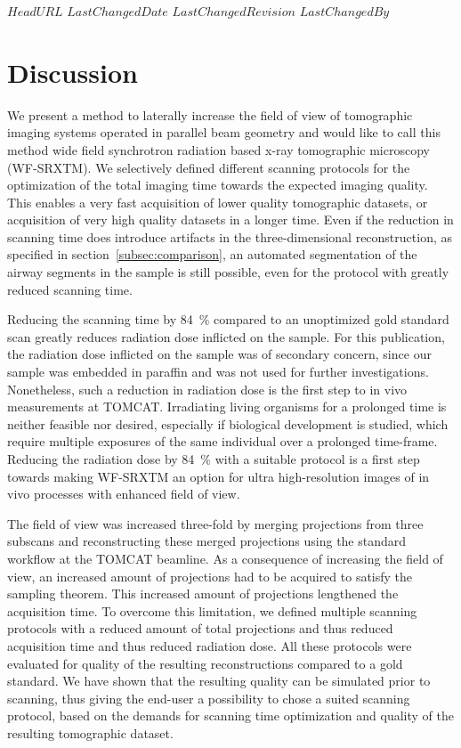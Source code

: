 \svnidlong
{$HeadURL$}
{$LastChangedDate$}
{$LastChangedRevision$}
{$LastChangedBy$}
%
\section{Discussion}\label{sec:Discussion}

We present a method to laterally increase the field of view of tomographic imaging systems operated in parallel beam geometry and would like to call this method wide field synchrotron radiation based x-ray tomographic microscopy (WF-SRXTM). We selectively defined different scanning protocols for the optimization of the total imaging time towards the expected imaging quality. This enables a very fast acquisition of lower quality tomographic datasets, or acquisition of very high quality datasets in a longer time. Even if the reduction in scanning time does introduce artifacts in the three-dimensional reconstruction, as specified in section~\ref{subsec:comparison}, an automated segmentation of the airway segments in the sample is still possible, even for the protocol with greatly reduced scanning time.

Reducing the scanning time by \SI{84}{\percent} compared to an unoptimized gold standard scan greatly reduces radiation dose inflicted on the sample. For this publication, the radiation dose inflicted on the sample was of secondary concern, since our sample was embedded in paraffin and was not used for further investigations. Nonetheless, such a reduction in radiation dose is the first step to in vivo measurements at TOMCAT. Irradiating living organisms for a prolonged time is neither feasible nor desired, especially if biological development is studied, which require multiple exposures of the same individual over a prolonged time-frame. Reducing the radiation dose by \SI{84}{\percent} with a suitable protocol is a first step towards making WF-SRXTM an option for ultra high-resolution images of in vivo processes with enhanced field of view.

The field of view was increased three-fold by merging projections from three subscans and reconstructing these merged projections using the standard workflow at the TOMCAT beamline. As a consequence of increasing the field of view, an increased amount of projections had to be acquired to satisfy the sampling theorem. This increased amount of projections lengthened the acquisition time. To overcome this limitation, we defined multiple scanning protocols with a reduced amount of total projections and thus reduced acquisition time and thus reduced radiation dose. All these protocols were evaluated for quality of the resulting reconstructions compared to a gold standard. We have shown that the resulting quality can be simulated prior to scanning, thus giving the end-user a possibility to chose a suited scanning protocol, based on the demands for scanning time optimization and quality of the resulting tomographic dataset.

